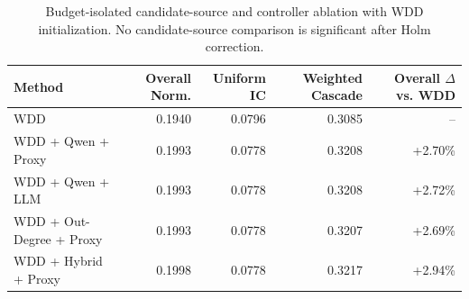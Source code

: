 \begin{table}[t]
\centering
\caption{Budget-isolated candidate-source and controller ablation with WDD initialization. No candidate-source comparison is significant after Holm correction.}
\label{tab:wdd_ablation}
\small
\begin{tabular}{lrrrr}
\toprule
Method & Overall Norm. & Uniform IC & Weighted Cascade & Overall $\Delta$ vs. WDD \\
\midrule
WDD & 0.1940 & 0.0796 & 0.3085 & -- \\
WDD + Qwen + Proxy & 0.1993 & 0.0778 & 0.3208 & +2.70\% \\
WDD + Qwen + LLM & 0.1993 & 0.0778 & 0.3208 & +2.72\% \\
WDD + Out-Degree + Proxy & 0.1993 & 0.0778 & 0.3207 & +2.69\% \\
WDD + Hybrid + Proxy & 0.1998 & 0.0778 & 0.3217 & +2.94\% \\
\bottomrule
\end{tabular}
\end{table}
